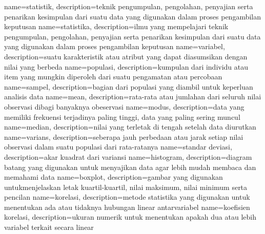 {
	name={statistik},
	description={teknik pengumpulan, pengolahan, penyajian serta penarikan kesimpulan dari suatu data yang digunakan dalam proses pengambilan keputusan}
}
{
	name={statistika},
	description={ilmu yang mempelajari teknik pengumpulan, pengolahan, penyajian serta penarikan kesimpulan dari suatu data yang digunakan dalam proses pengambilan keputusan}
}
{
	name={variabel},
	description={suatu karakteristik atau atribut yang dapat diasumsikan dengan nilai yang berbeda}
}
{
	name={populasi},
	description={kumpulan dari individu atau item yang mungkin diperoleh dari suatu pengamatan atau percobaan}
}
{
	name={sampel},
	description={bagian dari populasi yang diambil untuk keperluan analisis data}
}
{
	name={mean},
	description={rata-rata atau jumlahan dari seluruh nilai observasi dibagi banyaknya obeservasi}
}
{
	name={modus},
	description={data yang memiliki frekuensi terjadinya paling tinggi, data yang paling sering muncul}
}
{
	name={median},
	description={nilai yang terletak di tengah setelah data diurutkan}
}
{
	name={varians},
	description={seberapa jauh perbedaan atau jarak setiap nilai observasi dalam suatu populasi dari rata-ratanya}
}
{
	name={standar deviasi},
	description={akar kuadrat dari variansi}
}
{
	name={histogram},
	description={diagram batang yang digunakan untuk menyajikan data agar lebih mudah membaca dan memahami data}
}
{
	name={boxplot},
	description={gambar yang digunakan untukmenjelaskan letak kuartil-kuartil, nilai maksimum, nilai minimum serta pencilan}
}
{
	name={korelasi},
	description={metode statistika yang digunakan untuk menentukan ada atau tidaknya hubungan linear antarvariabel}
}
{
	name={koefisien korelasi},
	description={ukuran numerik untuk menentukan apakah dua atau lebih variabel terkait secara linear}
}